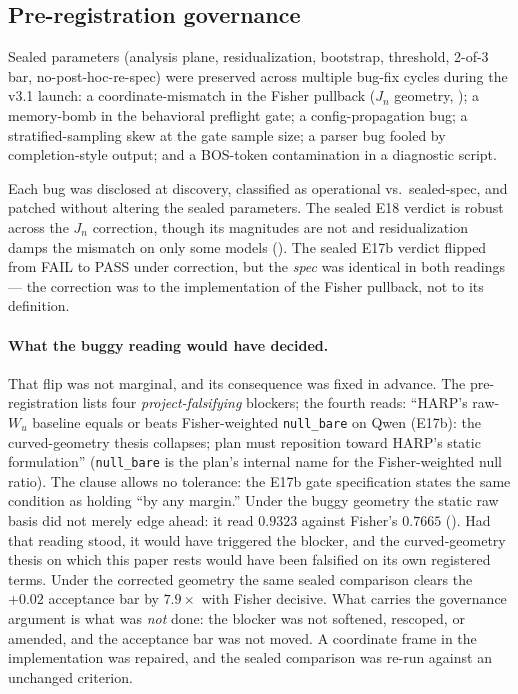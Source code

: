 \documentclass[10pt, letterpaper]{article}
\newcommand{\Wu}{W_u}
\newcommand{\Jn}{J_n}
\begin{document}
\subsection{Pre-registration governance}
\label{sec:disc:prereg}

Sealed parameters (analysis plane, residualization, bootstrap,
threshold, 2-of-3 bar, no-post-hoc-re-spec) were preserved across
multiple bug-fix cycles during the v3.1 launch: a coordinate-mismatch
in the Fisher pullback ($\Jn$ geometry, ); a
memory-bomb in the behavioral preflight gate; a config-propagation
bug; a stratified-sampling skew at the gate sample size; a parser bug
fooled by completion-style output; and a BOS-token contamination in a
diagnostic script.

Each bug was disclosed at discovery, classified as operational vs.\
sealed-spec, and patched without altering the sealed parameters. The
sealed E18 verdict is robust across the $\Jn$ correction, though its
magnitudes are not and residualization damps the mismatch on only some
models (\Cref{sec:methods:jn}). The sealed E17b verdict flipped
from FAIL to PASS under correction, but the \emph{spec} was identical
in both readings --- the correction was to the implementation of the
Fisher pullback, not to its definition.

\paragraph{What the buggy reading would have decided.} That flip was
not marginal, and its consequence was fixed in advance. The
pre-registration lists four \emph{project-falsifying} blockers; the
fourth reads: ``HARP's raw-$\Wu$ baseline equals or beats
Fisher-weighted \texttt{null\_bare} on Qwen (E17b): the
curved-geometry thesis collapses; plan must reposition toward HARP's
static formulation'' (\texttt{null\_bare} is the plan's internal name
for the Fisher-weighted null ratio). The clause allows no tolerance:
the E17b gate specification states the same condition as holding ``by
any margin.'' Under the buggy geometry the static raw basis did not merely
edge ahead: it read $0.9323$ against Fisher's $0.7665$
(). Had that reading stood, it would have triggered the
blocker, and the curved-geometry thesis on which this paper rests
would have been falsified on its own registered terms. Under the
corrected geometry the same sealed comparison clears the $+0.02$
acceptance bar by $7.9\times$ with Fisher decisive. What carries the
governance argument is what was \emph{not} done: the blocker was not
softened, rescoped, or amended, and the acceptance bar was not moved.
A coordinate frame in the implementation was repaired, and the sealed
comparison was re-run against an unchanged criterion.
\end{document}
